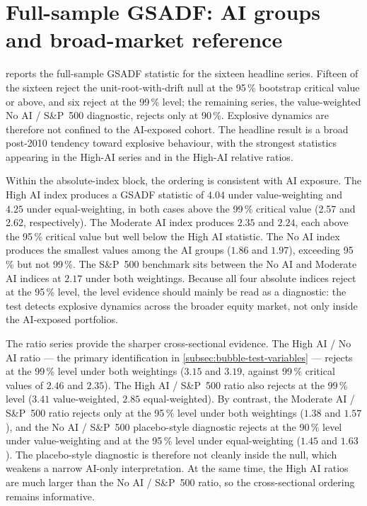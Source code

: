 \section{Full-sample GSADF: AI groups and broad-market reference}
\label{sec:results-headline}
 
 reports the full-sample GSADF statistic for the sixteen headline series. Fifteen of the sixteen reject the unit-root-with-drift null at the 95\,\% bootstrap critical value or above, and six reject at the 99\,\% level; the remaining series, the value-weighted No AI / S\&P~500 diagnostic, rejects only at 90\,\%. Explosive dynamics are therefore not confined to the AI-exposed cohort. The headline result is a broad post-2010 tendency toward explosive behaviour, with the strongest statistics appearing in the High-AI series and in the High-AI relative ratios.
 
Within the absolute-index block, the ordering is consistent with AI exposure. The High AI index produces a GSADF statistic of $4.04$ under value-weighting and $4.25$ under equal-weighting, in both cases above the 99\,\% critical value (\num{2.57} and \num{2.62}, respectively). The Moderate AI index produces $2.35$ and $2.24$, each above the 95\,\% critical value but well below the High AI statistic. The No AI index produces the smallest values among the AI groups ($1.86$ and $1.97$), exceeding 95\,\% but not 99\,\%. The S\&P~500 benchmark sits between the No AI and Moderate AI indices at $2.17$ under both weightings. Because all four absolute indices reject at the 95\,\% level, the level evidence should mainly be read as a diagnostic: the test detects explosive dynamics across the broader equity market, not only inside the AI-exposed portfolios.
 
The ratio series provide the sharper cross-sectional evidence. The High AI / No AI ratio --- the primary identification in \cref{subsec:bubble-test-variables} --- rejects at the 99\,\% level under both weightings ($3.15$ and $3.19$, against 99\,\% critical values of $2.46$ and $2.35$). The High AI / S\&P~500 ratio also rejects at the 99\,\% level ($3.41$ value-weighted, $2.85$ equal-weighted). By contrast, the Moderate AI / S\&P~500 ratio rejects only at the 95\,\% level under both weightings ($1.38$ and $1.57$), and the No AI / S\&P~500 placebo-style diagnostic rejects at the 90\,\% level under value-weighting and at the 95\,\% level under equal-weighting ($1.45$ and $1.63$). The placebo-style diagnostic is therefore not cleanly inside the null, which weakens a narrow AI-only interpretation. At the same time, the High AI ratios are much larger than the No AI / S\&P~500 ratio, so the cross-sectional ordering remains informative.
 
